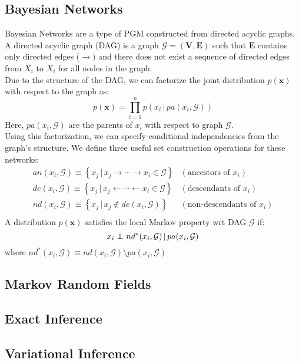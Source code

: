 \subsection{Bayesian Networks}
Bayesian Networks are a type of PGM constructed from directed acyclic graphs.
A directed acyclic graph (DAG) is a graph $\mathcal{G} = (\mathbf{V}, \mathbf{E})$
such that $\mathbf{E}$ contains only directed edges ($\rightarrow)$ and there
does not exist a sequence of directed edges from $X_i$ to $X_i$ for all nodes
in the graph.\\
Due to the structure of the DAG, we can factorize the joint distribution
$p(\mathbf{x})$ with respect to the graph as:
\begin{equation}
  p(\mathbf{x}) = \prod_{i=1}^n p(x_i \, | \, pa(x_i, \mathcal{G}))
\end{equation}
Here, $pa(x_i, \mathcal{G})$ are the parents of $x_i$ with respect to graph $\mathcal{G}$.\\
Using this factorization, we can specify conditional independencies from the graph's structure.
We define three useful set construction operations for these networks:
\begin{equation}
  \begin{matrix}
    an(x_i, \mathcal{G}) \equiv \left\{ x_j \, | \, x_j \rightarrow \cdots \rightarrow x_i \in \mathcal{G} \right\} & (\textrm{ancestors of } x_i)\\
    de(x_i, \mathcal{G}) \equiv \left\{ x_j \, | \, x_j \leftarrow \cdots \leftarrow x_i \in \mathcal{G} \right\} & (\textrm{descendants of } x_i)\\
    nd(x_i, \mathcal{G}) \equiv \left\{ x_j \, | \, x_j \notin de(x_i, \mathcal{G}) \right\} & (\textrm{non-descendants of } x_i)\\
  \end{matrix}
\end{equation}
A distribution $p(\mathbf{x})$ satisfies the local Markov property wrt DAG
$\mathcal{G}$ if:
\begin{equation}
  x_i \indep nd^*(x_i, \mathcal{G}) \, | \, pa(x_i, \mathcal{G})
\end{equation}
where $nd^*(x_i, \mathcal{G}) \equiv nd(x_i, \mathcal{G}) \setminus pa(x_i, \mathcal{G})$\\

\subsection{Markov Random Fields}
\subsection{Exact Inference}
\subsection{Variational Inference}
